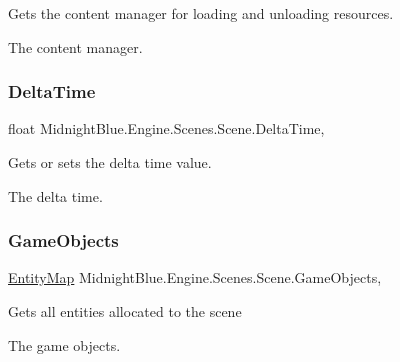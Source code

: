 Gets the content manager for loading and unloading resources. 

The content manager.\hypertarget{class_midnight_blue_1_1_engine_1_1_scenes_1_1_scene_a51414d69565d89db676b16932f3822e9}{}\label{class_midnight_blue_1_1_engine_1_1_scenes_1_1_scene_a51414d69565d89db676b16932f3822e9} 
\subsubsection{\texorpdfstring{Delta\+Time}{DeltaTime}}
{\footnotesize\ttfamily float Midnight\+Blue.\+Engine.\+Scenes.\+Scene.\+Delta\+Time\hspace{0.3cm}{\ttfamily [get]}, {\ttfamily [set]}}



Gets or sets the delta time value. 

The delta time.\hypertarget{class_midnight_blue_1_1_engine_1_1_scenes_1_1_scene_adbcdbbf88e88d55d673cd5be8c79555c}{}\label{class_midnight_blue_1_1_engine_1_1_scenes_1_1_scene_adbcdbbf88e88d55d673cd5be8c79555c} 
\subsubsection{\texorpdfstring{Game\+Objects}{GameObjects}}
{\footnotesize\ttfamily \hyperlink{class_midnight_blue_1_1_engine_1_1_entity_component_1_1_entity_map}{Entity\+Map} Midnight\+Blue.\+Engine.\+Scenes.\+Scene.\+Game\+Objects\hspace{0.3cm}{\ttfamily [get]}, {\ttfamily [protected]}}



Gets all entities allocated to the scene 

The game objects.\hypertarget{class_midnight_blue_1_1_engine_1_1_scenes_1_1_scene_a13fa8b0788c8b7499a79b9f6374465c8}{}\label{class_midnight_blue_1_1_engine_1_1_scenes_1_1_scene_a13fa8b0788c8b7499a79b9f6374465c8} 
